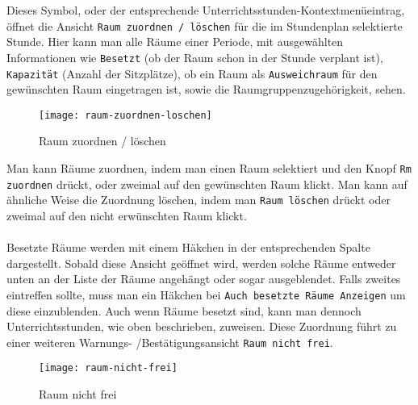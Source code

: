 \noindent
Dieses Symbol, oder der entsprechende Unterrichtsstunden-Kontextmenüeintrag, öffnet die Ansicht \texttt{Raum zuordnen / löschen} für die im Stundenplan selektierte Stunde. Hier kann man alle Räume einer Periode, mit ausgewählten Informationen wie \texttt{Besetzt} (ob der Raum schon in der Stunde verplant ist), \texttt{Kapazität} (Anzahl der Sitzplätze), ob ein Raum als \texttt{Ausweichraum} für den gewünschten Raum eingetragen ist, sowie die Raumgruppenzugehörigkeit, sehen.\\

\begin{wrapfigure}{r}{0.3\textwidth}
	\vspace{-14pt}
	\texttt{[image: raum-zuordnen-loschen]}
	\vspace{-15pt}
	\caption{Raum zuordnen / löschen}
	\label{fig:raum-zuordnen-loschen}
\end{wrapfigure}

\noindent
Man kann Räume zuordnen, indem man einen Raum selektiert und den Knopf \texttt{Rm zuordnen} drückt, oder zweimal auf den gewünschten Raum klickt. Man kann auf ähnliche Weise die Zuordnung löschen, indem man \texttt{Raum löschen} drückt oder zweimal auf den nicht erwünschten Raum klickt.\\
\\
Besetzte Räume werden mit einem Häkchen in der entsprechenden Spalte dargestellt. Sobald diese Ansicht geöffnet wird, werden solche Räume entweder unten an der Liste der Räume angehängt oder sogar ausgeblendet. Falls zweites eintreffen sollte, muss man ein Häkchen bei \texttt{Auch besetzte Räume Anzeigen} um diese einzublenden. Auch wenn Räume besetzt sind, kann man dennoch Unterrichtsstunden, wie oben beschrieben, zuweisen. Diese Zuordnung führt zu einer weiteren Warnungs- /Bestätigungsansicht \texttt{Raum nicht frei}.\\

\newpage

\begin{wrapfigure}{r}{0.3\textwidth}
	\texttt{[image: raum-nicht-frei]}
	\vspace{-15pt}
	\caption{Raum nicht frei}
	\label{fig:raum-nicht-frei}
	\vspace{10pt}
\end{wrapfigure}

